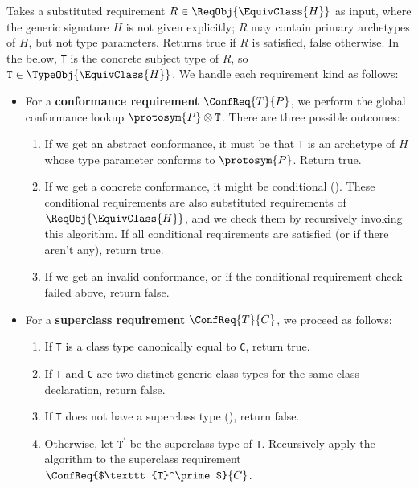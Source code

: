 \documentclass[../generics]{subfiles}
\begin{document}
\begin{algorithm}\label{reqissatisfied}
Takes a substituted requirement $R\in\ReqObj{\EquivClass{H}}$ as input, where the generic signature $H$ is not given explicitly; $R$ may contain primary archetypes of $H$, but not type parameters. Returns true if $R$ is satisfied, false otherwise. In the below, \texttt{T} is the concrete subject type of $R$, so $\texttt{T}\in\TypeObj{\EquivClass{H}}$. We handle each requirement kind as follows:
\begin{itemize}
\item For a \textbf{conformance requirement} $\ConfReq{T}{P}$, we perform the global conformance lookup $\protosym{P}\otimes\texttt{T}$. There are three possible outcomes:
\begin{enumerate}
\item If we get an abstract conformance, it must be that \texttt{T} is an archetype of $H$ whose type parameter conforms to $\protosym{P}$. Return true.
\item If we get a concrete conformance, it might be conditional (). These conditional requirements are also substituted requirements of $\ReqObj{\EquivClass{H}}$, and we check them by recursively invoking this algorithm. If all conditional requirements are satisfied (or if there aren't any), return true.
\item If we get an invalid conformance, or if the conditional requirement check failed above, return false.
\end{enumerate}
\item For a \textbf{superclass requirement} $\ConfReq{T}{C}$, we proceed as follows:
\begin{enumerate}
\item If \texttt{T} is a class type canonically equal to \texttt{C}, return true.
\item If \texttt{T} and \texttt{C} are two distinct generic class types for the same class declaration, return false.
\item If \texttt{T} does not have a superclass type (), return false.
\item Otherwise, let $\texttt{T}^\prime$ be the superclass type of \texttt{T}. Recursively apply the algorithm to the superclass requirement $\ConfReq{$\texttt{T}^\prime$}{C}$.

\end{enumerate}
\end{itemize}
\end{algorithm}
\end{document}
